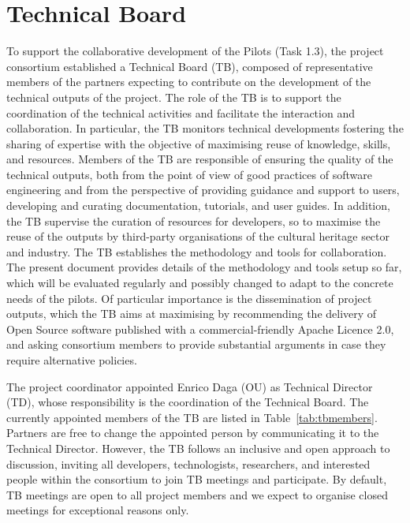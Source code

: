 \chapter{Technical Board}\label{ch:technical-board}
To support the collaborative development of the Pilots (Task 1.3), the project consortium established a Technical Board (TB), composed of representative members of the partners expecting to contribute on the development of the technical outputs of the project.
The role of the TB is to support the coordination of the technical activities and facilitate the interaction and collaboration.
In particular, the TB monitors technical developments fostering the sharing of expertise with the objective of maximising reuse of knowledge, skills, and resources.
Members of the TB are responsible of ensuring the quality of the technical outputs, both from the point of view of good practices of software engineering and from the perspective of providing guidance and support to users, developing and curating documentation, tutorials, and user guides.
In addition, the TB supervise the curation of resources for developers, so to maximise the reuse of the outputs by third-party organisations of the cultural heritage sector and industry. %
The TB establishes the methodology and tools for collaboration.
The present document provides details of the methodology and tools setup so far, which will be evaluated regularly and possibly changed to adapt to the concrete needs of the pilots.
Of particular importance is the dissemination of project outputs, which the TB aims at maximising by recommending the delivery of Open Source software published with a commercial-friendly Apache Licence 2.0, and asking consortium members to provide substantial arguments in case they require alternative policies. %

The project coordinator appointed Enrico Daga (OU) as Technical Director (TD), whose responsibility is the coordination of the Technical Board. 
The currently appointed members of the TB are listed in Table~\ref{tab:tbmembers}.%
Partners are free to change the appointed person by communicating it to the Technical Director.
However, the TB follows an inclusive and open approach to discussion, inviting all developers, technologists, researchers, and interested people within the consortium to join TB meetings and participate. By default, TB meetings are open to all project members and we expect to organise closed meetings for exceptional reasons only.

